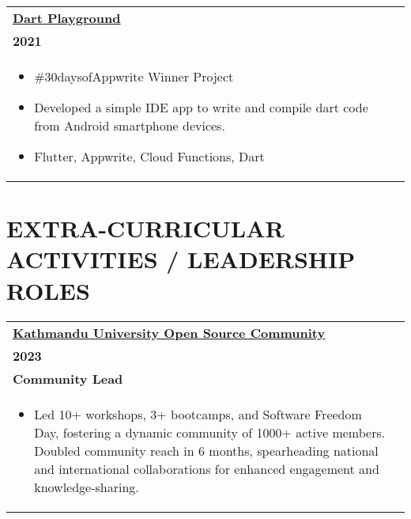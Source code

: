 \documentclass[a4paper,8pt]{article}
\begin{document}
\begin{tabularx}{\linewidth}{ @{}l r@{} }
\textbf{\underline{\href{https://github.com/aadarshadhakalg/Dart-Playground}{Dart Playground}}} \\[4pt]
\textbf{2021} \\[4pt]
\begin{minipage}[t]{\linewidth}
    \begin{itemize}[nosep,after=\strut, leftmargin=1em, itemsep=2pt]
        \item \#30daysofAppwrite Winner Project
        \item Developed a simple IDE app to write and compile dart code from Android smartphone devices.
        \item Flutter, Appwrite, Cloud Functions, Dart
    \end{itemize}
\end{minipage}
\end{tabularx}

\section{\textbf{EXTRA-CURRICULAR ACTIVITIES / LEADERSHIP ROLES}}
\begin{tabularx}{\linewidth}{ @{}l r@{} }
\textbf{\underline{\href{https://kuosc.org.np}{Kathmandu University Open Source Community}}} \\[4pt]
\textbf{2023} \\[4pt]
\textbf{Community Lead} \\[4pt]
\begin{minipage}[t]{\linewidth}
    \begin{itemize}[nosep,after=\strut, leftmargin=1em, itemsep=2pt]
        \item Led 10+ workshops, 3+ bootcamps, and Software Freedom Day, fostering a dynamic community of 1000+ active members. Doubled community reach in 6 months, spearheading national and international collaborations for enhanced engagement and knowledge-sharing.
    \end{itemize}
\end{minipage}
\end{tabularx}

\end{document}
